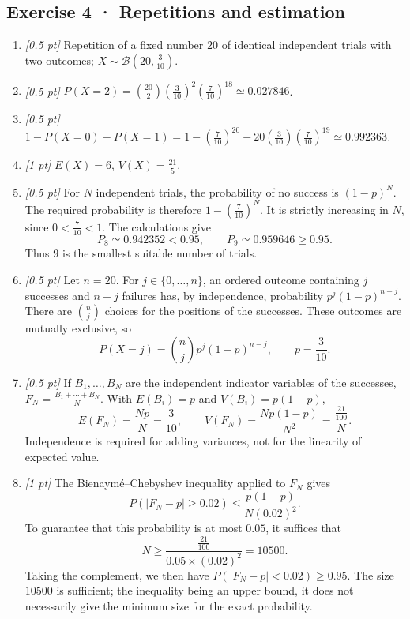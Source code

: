\subsection*{Exercise 4 · Repetitions and estimation}\begin{enumerate}

\item \textit{[0.5 pt]} Repetition of a fixed number $20$ of identical independent trials with two outcomes; $X\sim\mathcal B(20,\frac{3}{10})$.

\item \textit{[0.5 pt]} $P(X=2)=\binom{20}2(\frac{3}{10})^2(\frac{7}{10})^{18}\simeq0.027846$.

\item \textit{[0.5 pt]} $1-P(X=0)-P(X=1)=1-(\frac{7}{10})^{20}-20(\frac{3}{10})(\frac{7}{10})^{19}\simeq0.992363$.

\item \textit{[1 pt]} $E(X)=6$, $V(X)=\frac{21}{5}$.

\item \textit{[0.5 pt]} For $N$ independent trials, the probability of no success is $(1-p)^N$. The required probability is therefore $1-(\frac{7}{10})^N$. It is strictly increasing in $N$, since $0<\frac{7}{10}<1$. The calculations give
\[P_{8}\simeq0.942352<0.95,\qquad P_{9}\simeq0.959646\ge0.95.\]
Thus $9$ is the smallest suitable number of trials.

\item \textit{[0.5 pt]} Let $n=20$. For $j\in\{0,\ldots,n\}$, an ordered outcome containing $j$ successes and $n-j$ failures has, by independence, probability $p^j(1-p)^{n-j}$. There are $\binom nj$ choices for the positions of the successes. These outcomes are mutually exclusive, so
\[P(X=j)=\binom nj p^j(1-p)^{n-j},\qquad p=\frac{3}{10}.\]

\item \textit{[0.5 pt]} If $B_1,\ldots,B_N$ are the independent indicator variables of the successes, $F_N=\frac{B_1+\cdots+B_N}{N}$. With $E(B_i)=p$ and $V(B_i)=p(1-p)$,
\[E(F_N)=\frac{Np}{N}=\frac{3}{10},\qquad V(F_N)=\frac{Np(1-p)}{N^2}=\frac{\frac{21}{100}}{N}.\]
Independence is required for adding variances, not for the linearity of expected value.

\item \textit{[1 pt]} The Bienaymé–Chebyshev inequality applied to $F_N$ gives
\[P(|F_N-p|\ge0.02)\le\frac{p(1-p)}{N(0.02)^2}.\]
To guarantee that this probability is at most $0.05$, it suffices that
\[N\ge\frac{\frac{21}{100}}{0.05\times(0.02)^2}=10500.\]
Taking the complement, we then have $P(|F_N-p|<0.02)\ge0.95$. The size $10500$ is sufficient; the inequality being an upper bound, it does not necessarily give the minimum size for the exact probability.

\end{enumerate}

\fi

\fi

